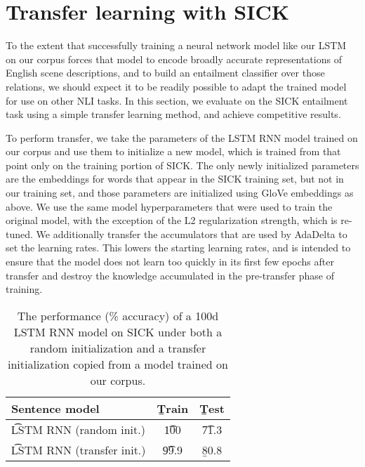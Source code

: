 \section{Transfer learning with SICK}

To the extent that successfully training a neural network model like our LSTM on our corpus forces that model to encode broadly accurate representations of English scene descriptions, and to build an entailment classifier over those relations, we should expect it to be readily possible to adapt the trained model for use on other NLI tasks. In this section, we evaluate on the SICK entailment task using a simple transfer learning method, and achieve competitive results.

To perform transfer, we take the parameters of the LSTM RNN model trained on our corpus and use them to initialize a new model, which is trained from that point only on the training portion of SICK. The only newly initialized parameters are the embeddings for words that appear in the SICK training set, but not in our training set, and those parameters are initialized using GloVe embeddings as above. We use the same model hyperparameters that were used to train the original model, with the exception of the L2 regularization strength, which is re-tuned. We additionally transfer the accumulators that are used by AdaDelta to set the learning rates. This lowers the starting learning rates, and is intended to ensure that the model does not learn too quickly in its first few epochs after transfer and destroy the knowledge accumulated in the pre-transfer phase of training.

\begin{table}
\begin{center}
\begin{tabular}{l@{\hskip \colspaceL}@{\hskip \colspaceL}c@{\hskip \colspaceL}c}
\toprule
\textbf{Sentence model} & \b{Train}  & \b{Test}\\
\midrule
\t{LSTM RNN (random init.)}            & \t{100} & \t{71.3} \\

\t{LSTM RNN (transfer init.)}            & \t{99.9} & \b{80.8} \\
\bottomrule
\end{tabular}
\end{center}

\caption{\label{tab:transferresults}
The performance (\% accuracy) of a 100d LSTM RNN model on SICK under both a random initialization and a transfer initialization copied from a model trained on our corpus.} 
\end{table}

